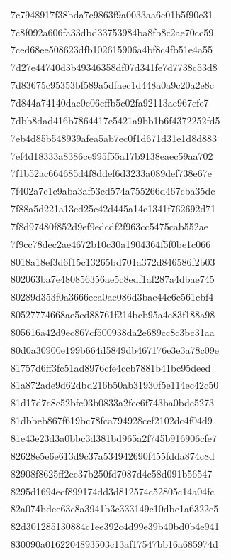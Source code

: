 \begin{tabular}{l}
7c7948917f38bda7c9863f9a0033aa6e01b5f90c31 \\
7c8f092a606fa33dbd33753984ba8fb8c2ae70cc59 \\
7ced68ee508623dfb102615906a4bf8c4fb51e4a55 \\
7d27e44740d3b49346358df07d341fe7d7738c53d8 \\
7d83675c95353bf589a5dfaec1d448a0a9c20a2e8c \\
7d844a74140dae0c06cffb5c02fa92113ae967efe7 \\
7dbb8dad416b7864417e5421a9bb1b6f4372252fd5 \\
7eb4d85b548939afea5ab7ec0f1d671d31e1d8d883 \\
7ef4d18333a8386ce995f55a17b9138eaec59aa702 \\
7f1b52ac664685d4f8ddef6d3233a089def738e67e \\
7f402a7c1c9aba3af53cd574a755266d467cba35dc \\
7f88a5d221a13cd25c42d445a14c1341f762692d71 \\
7f8d97480f852d9ef9edcdf2f963cc5475cab552ae \\
7f9cc78dec2ae4672b10c30a1904364f5f0be1c066 \\
8018a18ef3d6f15c13265bd701a372d846586f2b03 \\
802063ba7e480856356ae5c8edf1af287a4dbae745 \\
80289d353f0a3666eca0ae086d3bac44c6c561cbf4 \\
80527774668ae5cd88761f214bcb95a4e83f188a98 \\
805616a42d9ec867cf500938da2e689cc8c3bc31aa \\
80d0a30900e199b664d5849db467176e3e3a78c09e \\
81757d6ff3fc51ad8976cfe4ccb7881b41bc95deed \\
81a872ade9d62dbd216b50ab31930f5e114ec42c50 \\
81d17d7c8c52bfc03b0833a2fec6f743ba0bde5273 \\
81dbbeb867f619bc78fca794928cef2102dc4f04d9 \\
81e43e23d3a0bbc3d381bd965a2f745b916906cfe7 \\
82628e5e6e613d9c37a534942690f455fdda874c8d \\
82908f8625ff2ee37b250fd7087d4c58d091b56547 \\
8295d1694ecf899174dd3d812574c52805c14a04fc \\
82a074bdee63c8a3941b3c333149c10dbe1a6322e5 \\
82d301285130884c1ee392c4d99e39b40bd0b4e941 \\
830090a0162204893503c13af17547bb16a685974d \\

\end{tabular}
